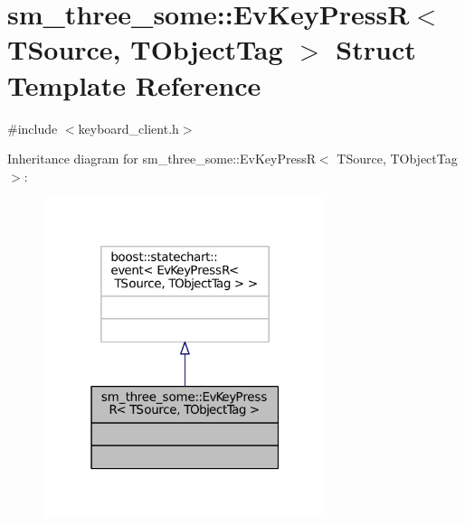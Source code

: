 \hypertarget{structsm__three__some_1_1EvKeyPressR}{}\section{sm\+\_\+three\+\_\+some\+:\+:Ev\+Key\+PressR$<$ T\+Source, T\+Object\+Tag $>$ Struct Template Reference}
\label{structsm__three__some_1_1EvKeyPressR}


{\ttfamily \#include $<$keyboard\+\_\+client.\+h$>$}



Inheritance diagram for sm\+\_\+three\+\_\+some\+:\+:Ev\+Key\+PressR$<$ T\+Source, T\+Object\+Tag $>$\+:
\nopagebreak
\begin{figure}[H]
\begin{center}
\leavevmode
\includegraphics[width=235pt]{structsm__three__some_1_1EvKeyPressR__inherit__graph}
\end{center}
\end{figure}


